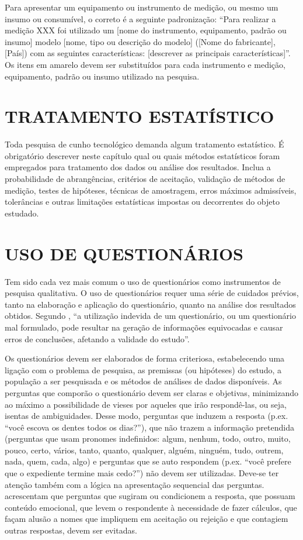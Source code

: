 Para apresentar um equipamento ou instrumento de medição, ou mesmo um insumo ou consumível, o correto é a seguinte padronização: “Para realizar a medição XXX foi utilizado um [nome do instrumento, equipamento, padrão ou insumo] modelo [nome, tipo ou descrição do modelo] ([Nome do fabricante], [País]) com as seguintes características: [descrever as principais características]”. Os itens em amarelo devem ser substituídos para cada instrumento e medição, equipamento, padrão ou insumo utilizado na pesquisa.

\section{TRATAMENTO ESTATÍSTICO}

Toda pesquisa de cunho tecnológico demanda algum tratamento estatístico. É obrigatório descrever neste capítulo qual ou quais métodos estatísticos foram empregados para tratamento dos dados ou análise dos resultados. Inclua a probabilidade de abrangências, critérios de aceitação, validação de métodos de medição, testes de hipóteses, técnicas de amostragem, erros máximos admissíveis, tolerâncias e outras limitações estatísticas impostas ou decorrentes do objeto estudado.

\section{USO DE QUESTIONÁRIOS}
Tem sido cada vez mais comum o uso de questionários como instrumentos de pesquisa qualitativa. O uso de questionários requer uma série de cuidados prévios, tanto na elaboração e aplicação do questionário, quanto na análise dos resultados obtidos. Segundo , “a utilização indevida de um questionário, ou um questionário mal formulado, pode resultar na geração de informações equivocadas e causar erros de conclusões, afetando a validade do estudo”.

Os questionários devem ser elaborados de forma criteriosa, estabelecendo uma ligação com o problema de pesquisa, as premissas (ou hipóteses) do estudo, a população a ser pesquisada e os métodos de análises de dados disponíveis. As perguntas que comporão o questionário devem ser claras e objetivas, minimizando ao máximo a possibilidade de vieses por aqueles que irão respondê-las, ou seja, isentas de ambiguidades. Desse modo, perguntas que induzem a resposta (p.ex. “você escova os dentes todos os dias?”), que não trazem a informação pretendida (perguntas que usam pronomes indefinidos: algum, nenhum, todo, outro, muito, pouco, certo, vários, tanto, quanto, qualquer, alguém, ninguém, tudo, outrem, nada, quem, cada, algo) e perguntas que se auto respondem (p.ex. “você prefere que o expediente termine mais cedo?”) não devem ser utilizadas. Deve-se ter atenção também com a lógica na apresentação sequencial das perguntas.  acrescentam que perguntas que sugiram ou condicionem a resposta, que possuam conteúdo emocional, que levem o respondente à necessidade de fazer cálculos, que façam alusão a nomes que impliquem em aceitação ou rejeição e que contagiem outras respostas, devem ser evitadas.


